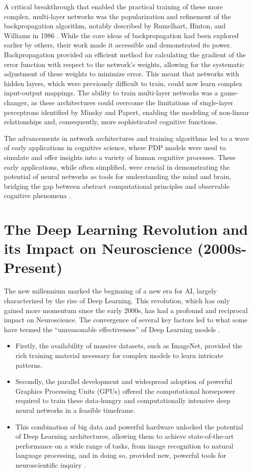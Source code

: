 \documentclass[11pt,a4paper]{article}
\begin{document}
A critical breakthrough that enabled the practical training of these more complex, multi-layer networks was the popularization and refinement of the backpropagation algorithm, notably described by Rumelhart, Hinton, and Williams in 1986 \cite{rumelhart1986learning}. While the core ideas of backpropagation had been explored earlier by others, their work made it accessible and demonstrated its power. Backpropagation provided an efficient method for calculating the gradient of the error function with respect to the network's weights, allowing for the systematic adjustment of these weights to minimize error. This meant that networks with hidden layers, which were previously difficult to train, could now learn complex input-output mappings. The ability to train multi-layer networks was a game-changer, as these architectures could overcome the limitations of single-layer perceptrons identified by Minsky and Papert, enabling the modeling of non-linear relationships and, consequently, more sophisticated cognitive functions.

The advancements in network architectures and training algorithms led to a wave of early applications in cognitive science, where PDP models were used to simulate and offer insights into a variety of human cognitive processes. These early applications, while often simplified, were crucial in demonstrating the potential of neural networks as tools for understanding the mind and brain, bridging the gap between abstract computational principles and observable cognitive phenomena \cite{mcclelland1986parallel}.

\section{The Deep Learning Revolution and its Impact on Neuroscience (2000s-Present)}\label{sec:2000s}

The new millennium marked the beginning of a new era for AI, largely characterized by the rise of Deep Learning. This revolution, which has only gained more momentum since the early 2000s, has had a profound and reciprocal impact on Neuroscience. The convergence of several key factors led to what some have termed the ``unreasonable effectiveness'' of Deep Learning models \cite{lecun2015deep}.
\begin{itemize}
    \item Firstly, the availability of massive datasets, such as ImageNet, provided the rich training material necessary for complex models to learn intricate patterns.
    \item Secondly, the parallel development and widespread adoption of powerful Graphics Processing Units (GPUs) offered the computational horsepower required to train these data-hungry and computationally intensive deep neural networks in a feasible timeframe.
    \item This combination of big data and powerful hardware unlocked the potential of Deep Learning architectures, allowing them to achieve state-of-the-art performance on a wide range of tasks, from image recognition to natural language processing, and in doing so, provided new, powerful tools for neuroscientific inquiry \cite{richards2019deep}.
\end{itemize}
\end{document}
